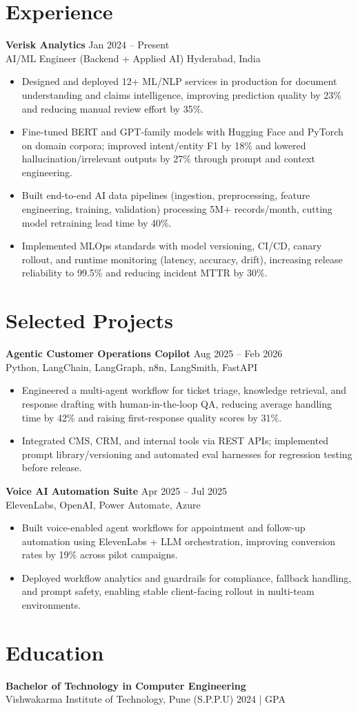 \documentclass[10pt,letterpaper]{article}
\newcommand{\resumeSubheading}[4]{%
  \textbf{#1} \hfill #2 \\
  #3 \hfill #4 \\
}
\begin{document}
\section*{Experience}
\resumeSubheading{Verisk Analytics}{Jan 2024 -- Present}{AI/ML Engineer (Backend + Applied AI)}{Hyderabad, India}
\begin{itemize}
    \item Designed and deployed 12+ ML/NLP services in production for document understanding and claims intelligence, improving prediction quality by 23\% and reducing manual review effort by 35\%.
    \item Fine-tuned BERT and GPT-family models with Hugging Face and PyTorch on domain corpora; improved intent/entity F1 by 18\% and lowered hallucination/irrelevant outputs by 27\% through prompt and context engineering.
    \item Built end-to-end AI data pipelines (ingestion, preprocessing, feature engineering, training, validation) processing 5M+ records/month, cutting model retraining lead time by 40\%.
    \item Implemented MLOps standards with model versioning, CI/CD, canary rollout, and runtime monitoring (latency, accuracy, drift), increasing release reliability to 99.5\% and reducing incident MTTR by 30\%.
\end{itemize}

\section*{Selected Projects}
\resumeSubheading{Agentic Customer Operations Copilot}{Aug 2025 -- Feb 2026}{}{Python, LangChain, LangGraph, n8n, LangSmith, FastAPI}
\begin{itemize}
    \item Engineered a multi-agent workflow for ticket triage, knowledge retrieval, and response drafting with human-in-the-loop QA, reducing average handling time by 42\% and raising first-response quality scores by 31\%.
    \item Integrated CMS, CRM, and internal tools via REST APIs; implemented prompt library/versioning and automated eval harnesses for regression testing before release.
\end{itemize}

\resumeSubheading{Voice AI Automation Suite}{Apr 2025 -- Jul 2025}{}{ElevenLabs, OpenAI, Power Automate, Azure}
\begin{itemize}
    \item Built voice-enabled agent workflows for appointment and follow-up automation using ElevenLabs + LLM orchestration, improving conversion rates by 19\% across pilot campaigns.
    \item Deployed workflow analytics and guardrails for compliance, fallback handling, and prompt safety, enabling stable client-facing rollout in multi-team environments.
\end{itemize}

\section*{Education}
\resumeSubheading{Bachelor of Technology in Computer Engineering}{}{Vishwakarma Institute of Technology, Pune (S.P.P.U)}{2024 \enspace | \enspace 8.8 GPA}
\end{document}
